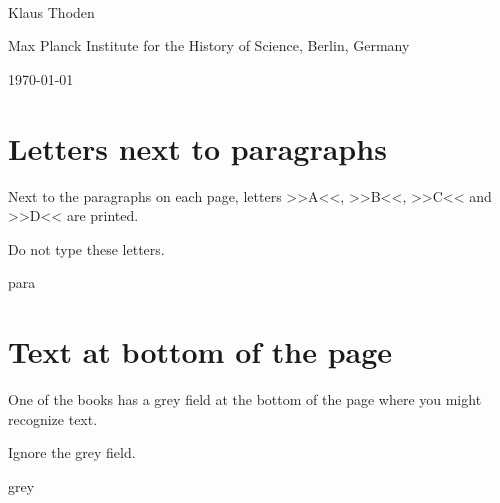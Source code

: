 \documentclass[fontsize=11pt, paper=a4, 
DIV15,
normalheadings,
parskip=half-, 
pointlessnumbers]{scrartcl}
\begin{document}
\begin{center}
{} \\[5mm]
\large Klaus Thoden

\normalsize Max Planck Institute for the History of Science, Berlin, Germany

\today
\end{center}


\section{Letters next to paragraphs}
\label{sec:lett-betw-columns}
Next to the paragraphs on each page, letters >>A<<, >>B<<, >>C<< and >>D<< are printed.

\begin{mainrule}
Do not type these letters.
\end{mainrule}


\begin{sampleImage}{para}
\end{sampleImage}


\section{Text at bottom of the page}
\label{sec:text-at-bottom}
One of the books has a grey field at the bottom of the page where you might recognize text.

\begin{mainrule}
Ignore the grey field.
\end{mainrule}

\begin{sampleImage}{grey}
\end{sampleImage}
\end{document}
